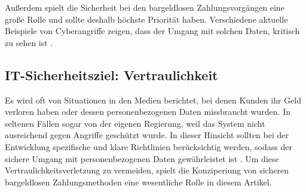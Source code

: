 Außerdem spielt die Sicherheit bei den bargeldlosen Zahlungsvorgängen eine große Rolle und sollte deshalb 
höchste Priorität haben. Verschiedene aktuelle Beispiele von Cyberangriffe zeigen, dass der Umgang mit
solchen Daten, kritisch zu sehen ist \cite{booklet:BKCB}. 

\subsection{IT-Sicherheitsziel: Vertraulichkeit}
Es wird oft von Situationen in den Medien berichtet, bei denen Kunden ihr Geld verloren haben oder dessen
personenbezogenen Daten missbraucht wurden. In seltenen Fällen sogar von der eigenen Regierung, weil das System 
nicht ausreichend gegen Angriffe geschützt wurde. In dieser Hinsicht sollten bei der Entwicklung spezifische 
und klare Richtlinien berücksichtig werden, sodass der sichere Umgang mit personenbezogenen Daten gewährleistet ist 
\cite{refart:TRVR}. Um diese Vertraulichkeitsverletzung zu vermeiden, spielt die Konziperiung von sicheren 
bargeldlosen Zahlungsmethoden eine wesentliche Rolle in diesem Artikel. 